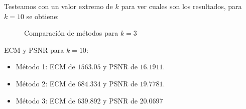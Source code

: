 Testeamos con un valor extremo de $k$ para ver cuales son los resultados, para $k=10$ se obtiene:

\begin{figure}[H]
    \centering
    \qquad
    \qquad
    \caption{Comparación de métodos para $k = 3$}%
    \label{fig:example}%
\end{figure}

ECM y PSNR para $k = 10$:

\begin{itemize}
 \item Método 1: ECM de $1563.05$ y PSNR de $16.1911$.
 \item Método 2: ECM de $684.334$ y PSNR de $19.7781$.
 \item Método 3: ECM de $639.892$ y PSNR de $20.0697$
\end{itemize}

